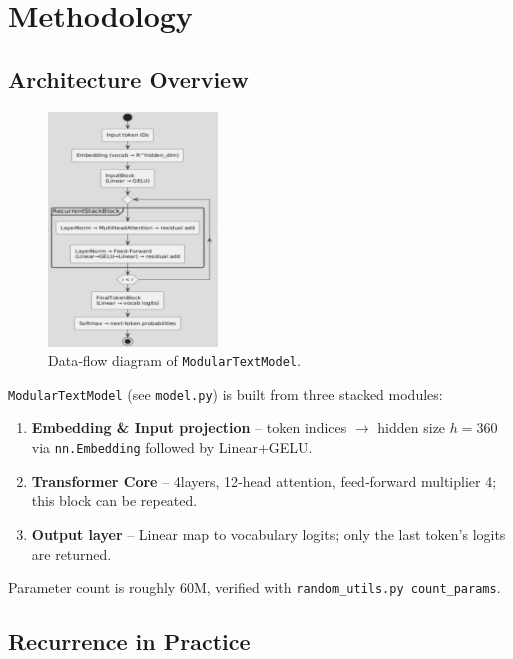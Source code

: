 \chapter{Methodology}\label{ch:methodology}

\section{Architecture Overview}

\begin{figure}[!ht]
    \centering
    \includegraphics[width=0.4\textwidth]{figs/model_architecture.png}
    \caption{Data‑flow diagram of \texttt{ModularTextModel}.}
    \label{fig:model_arch}
\end{figure}

\texttt{ModularTextModel} (see \texttt{model.py}) is built from three
stacked modules:

\begin{enumerate}
    \item \textbf{Embedding \& Input projection} – token indices
          $\rightarrow$ hidden size $h=360$ via
          \texttt{nn.Embedding} followed by Linear+GELU.
    \item \textbf{Transformer Core} – 4layers, 12‑head attention,
          feed‑forward multiplier 4; this block can be repeated.
    \item \textbf{Output layer} – Linear map to vocabulary logits;
          only the last token’s logits are returned.
\end{enumerate}

Parameter count is roughly 60M, verified with
\texttt{random\_utils.py count\_params}.



\section{Recurrence in Practice}


